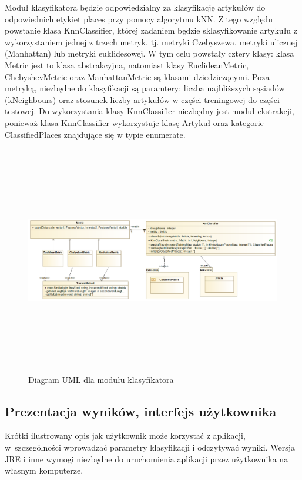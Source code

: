 \documentclass{classrep}
\begin{document}
\indent Moduł klasyfikatora będzie odpowiedzialny za klasyfikację artykułów do odpowiednich etykiet places przy pomocy algorytmu kNN. Z tego względu powstanie klasa KnnClassifier, której zadaniem będzie sklasyfikowanie artykułu z wykorzystaniem jednej z trzech metryk, tj. metryki Czebyszewa, metryki ulicznej (Manhattan) lub metryki euklidesowej. W tym celu powstały cztery klasy: klasa Metric jest to klasa abstrakcyjna, natomiast klasy EuclideanMetric, ChebyshevMetric oraz ManhattanMetric są klasami dziedziczącymi. Poza metryką, niezbędne do klasyfikacji są paramtery: liczba najbliższych sąsiadów (kNeighbours) oraz stosunek liczby artykułów w części treningowej do części testowej. Do wykorzystania klasy KnnClassifier niezbędny jest moduł ekstrakcji, ponieważ klasa KnnClassifier wykorzystuje klasę Artykuł oraz kategorie ClassifiedPlaces znajdujące się w typie enumerate. \\
\begin{figure}[htp]
    \centering
    \includegraphics[width=15cm, height=10cm]{modul_klasyfikatora.png}
    \caption{Diagram UML dla modułu klasyfikatora}
\end{figure}

\subsection{Prezentacja wyników, interfejs użytkownika} 
Krótki ilustrowany opis jak użytkownik może korzystać z aplikacji, w~szczególności wprowadzać parametry klasyfikacji i odczytywać wyniki. Wersja JRE i inne wymogi
niezbędne do uruchomienia aplikacji przez użytkownika na własnym komputerze. \\
\end{document}
